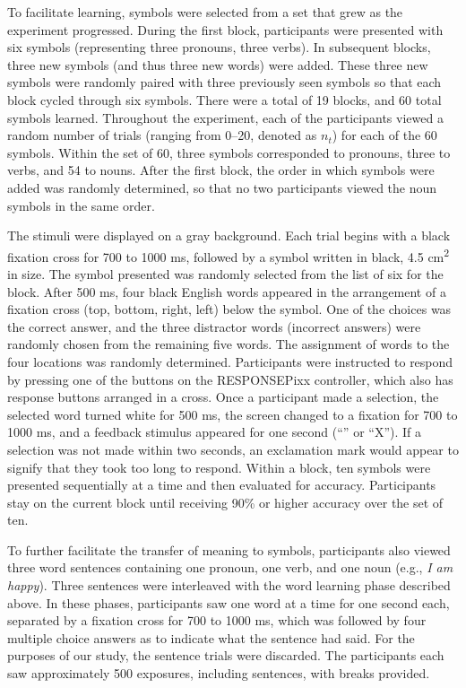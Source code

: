   To facilitate learning, symbols were selected from a set that grew as the experiment progressed. During the first block, participants were presented with six symbols (representing three pronouns, three verbs). In subsequent blocks, three new symbols (and thus three new words) were added. These three new symbols were randomly paired with three previously seen symbols so that each block cycled through six symbols. There were a total of 19 blocks, and 60 total symbols learned. Throughout the experiment, each of the participants viewed a random number of trials (ranging from 0--20, denoted as $n_t$) for each of the 60 symbols. Within the set of 60, three symbols corresponded to pronouns, three to verbs, and 54 to nouns. After the first block, the order in which symbols were added was randomly determined, so that no two participants viewed the noun symbols in the same order.
  
  The stimuli were displayed on a gray background.  Each trial begins with a black fixation cross for 700 to 1000 ms, followed by a symbol written in black, 4.5 cm\textsuperscript{2} in size. The symbol presented was randomly selected from the list of six for the block. After 500 ms, four black English words appeared in the arrangement of a fixation cross (top, bottom, right, left) below the symbol. One of the choices was the correct answer, and the three distractor words (incorrect answers) were randomly chosen from the remaining five words. The assignment of words to the four locations was randomly determined. Participants were instructed to respond by pressing one of the buttons on the RESPONSEPixx controller, which also has response buttons arranged in a cross. Once a participant made a selection, the selected word turned white for 500 ms, the screen changed to a fixation for 700 to 1000 ms, and a feedback stimulus appeared for one second (``\CheckmarkBold'' or ``X''). If a selection was not made within two seconds, an exclamation mark would appear to signify that they took too long to respond. Within a block, ten symbols were presented sequentially at a time and then evaluated for accuracy. Participants stay on the current block until receiving 90\% or higher accuracy over the set of ten.
  
  To further facilitate the transfer of meaning to symbols, participants also viewed three word sentences containing one pronoun, one verb, and one noun (e.g., \emph{I am happy}). Three sentences  were interleaved with the word learning phase described above. In these phases, participants saw one word at a time for one second each, separated by a fixation cross for 700 to 1000 ms, which was followed by four multiple choice answers as to indicate what the sentence had said. For the purposes of our study, the sentence trials were discarded. The participants each saw approximately 500 exposures, including sentences, with breaks provided.
